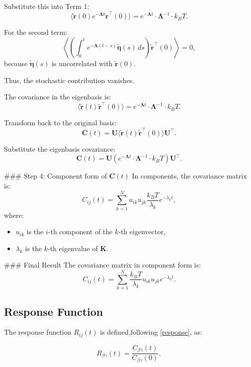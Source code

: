 \documentclass[English, Lau, oneside]{sapthesis}
\begin{document}
Substitute this into Term 1:
\[
\langle \tilde{\mathbf{r}}(0) e^{-\boldsymbol{\Lambda} t} \tilde{\mathbf{r}}^\top(0) \rangle = e^{-\boldsymbol{\Lambda} t} \cdot \boldsymbol{\Lambda}^{-1} \cdot k_B T.
\]

For the second term:
\[
\left\langle \left( \int_0^t e^{-\boldsymbol{\Lambda} (t-s)} \tilde{\boldsymbol{\eta}}(s) \, ds \right) \tilde{\mathbf{r}}^\top(0) \right\rangle = 0,
\]
because \(\tilde{\boldsymbol{\eta}}(s)\) is uncorrelated with \(\tilde{\mathbf{r}}(0)\).

Thus, the stochastic contribution vanishes.

The covariance in the eigenbasis is:
\[
\langle \tilde{\mathbf{r}}(t) \tilde{\mathbf{r}}^\top(0) \rangle = e^{-\boldsymbol{\Lambda} t} \cdot \boldsymbol{\Lambda}^{-1} \cdot k_B T.
\]

Transform back to the original basis:
\[
\mathbf{C}(t) = \mathbf{U} \langle \tilde{\mathbf{r}}(t) \tilde{\mathbf{r}}^\top(0) \rangle \mathbf{U}^\top.
\]

Substitute the eigenbasis covariance:
\[
\mathbf{C}(t) = \mathbf{U} \left( e^{-\boldsymbol{\Lambda} t} \cdot \boldsymbol{\Lambda}^{-1} \cdot k_B T \right) \mathbf{U}^\top.
\]

### Step 4: Component form of \(\mathbf{C}(t)\)
In components, the covariance matrix is:
\[
C_{ij}(t) = \sum_{k=1}^N u_{ik} u_{jk} \frac{k_B T}{\lambda_k} e^{-\lambda_k t},
\]
where:
\begin{itemize}
    \item \(u_{ik}\) is the \(i\)-th component of the \(k\)-th eigenvector,
    \item \(\lambda_k\) is the \(k\)-th eigenvalue of \(\mathbf{K}\).
\end{itemize}

### Final Result
The covariance matrix in component form is:
\[
C_{ij}(t) = \sum_{k=1}^N \frac{k_B T}{\lambda_k} u_{ik} u_{jk} e^{-\lambda_k t}.
\]



\subsection {Response Function}

The response function \(R_{ij}(t)\) is defined,following \eqref{response}, as:\cite{ref13}

\begin{equation}
    R_{\beta\gamma}(t) = \frac{C_{\beta\gamma}(t)}{C_{\beta\gamma}(0)},
    \end{equation}
    
\end{document}
